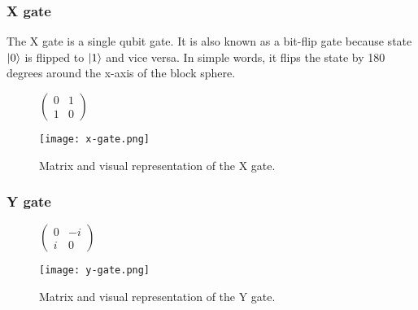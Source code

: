 \subsubsection{X gate}
The X gate is a single qubit gate. It is also known as a bit-flip gate because state $\lvert0\rangle$ is flipped to $\lvert1\rangle$ and vice versa. In simple words, it flips the state by 180 degrees around the x-axis of the block sphere.

\begin{figure}[H]
    \centering
    \begin{minipage}{0.4\linewidth}
      \centering
      $\begin{pmatrix}
        0 & 1 \\
        1 & 0
        \end{pmatrix}$
      \vfill
    \end{minipage}
    \begin{minipage}{0.25\linewidth}
      \centering
      \texttt{[image: x-gate.png]}
      \vfill
    \end{minipage}
    \caption{Matrix and visual representation of the X gate.}
\end{figure}



\subsubsection{Y gate}

\begin{figure}[H]
    \centering
    \begin{minipage}{0.4\linewidth}
      \centering
      $\begin{pmatrix}
        0 & -i \\
        i & 0
        \end{pmatrix}$
      \vfill
    \end{minipage}
    \begin{minipage}{0.25\linewidth}
      \centering
      \texttt{[image: y-gate.png]}
      \vfill
    \end{minipage}
    \caption{Matrix and visual representation of the Y gate.}
\end{figure}


